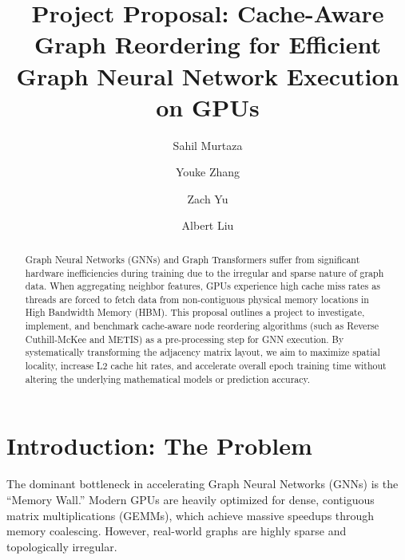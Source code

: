 \documentclass[sigconf,review]{acmart}
\begin{document}
\title{Project Proposal: Cache-Aware Graph Reordering for Efficient Graph Neural Network Execution on GPUs}

\author{Sahil Murtaza}

\author{Youke Zhang}

\author{Zach Yu}

\author{Albert Liu}

\begin{abstract}
Graph Neural Networks (GNNs) and Graph Transformers suffer from significant hardware inefficiencies during training due to the irregular and sparse nature of graph data. When aggregating neighbor features, GPUs experience high cache miss rates as threads are forced to fetch data from non-contiguous physical memory locations in High Bandwidth Memory (HBM). This proposal outlines a project to investigate, implement, and benchmark cache-aware node reordering algorithms (such as Reverse Cuthill-McKee and METIS) as a pre-processing step for GNN execution. By systematically transforming the adjacency matrix layout, we aim to maximize spatial locality, increase L2 cache hit rates, and accelerate overall epoch training time without altering the underlying mathematical models or prediction accuracy.
\end{abstract}


\maketitle

\section{Introduction: The Problem}
The dominant bottleneck in accelerating Graph Neural Networks (GNNs) is the ``Memory Wall.'' Modern GPUs are heavily optimized for dense, contiguous matrix multiplications (GEMMs), which achieve massive speedups through memory coalescing. However, real-world graphs are highly sparse and topologically irregular.
\end{document}
